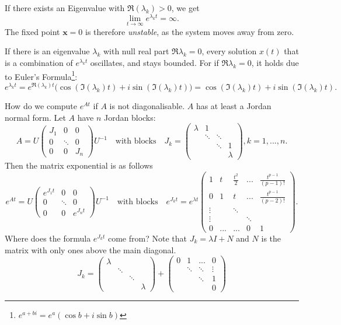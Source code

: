 \documentclass[hidelinks,a4paper, 11pt]{article}
\theoremstyle{plain}
\theoremstyle{break}
\theoremstyle{plain}
\theoremstyle{definition}
\begin{document}
If there exists an Eigenvalue with $\Re(\lambda_k) >0$, we get 
\[
	\lim_{t \to \infty}e^{\lambda_kt} = \infty.
\]
The fixed point $\mathbf x = 0$ is therefore  \emph{unstable}, as the system moves away from zero.

If there is an eigenvalue $\lambda_k$ with null real part $\Re \lambda_k =0$, every solution $x(t)$ that is a combination of $e^{\lambda_kt}$ oscillates, and stays bounded. For if $\Re \lambda_k =0$, it holds due to Euler's Formula\footnote{$e^{a+bi} = e^{a}(\cos b + i\sin b)$}:
\[
	e^{\lambda_k t} = e^{\Re(\lambda_k)t}\Big(\cos(\Im(\lambda_k)t) + i\sin(\Im(\lambda_k)t)\Big) = \cos(\Im(\lambda_k)t) + i\sin(\Im(\lambda_k)t).
\]

How do we compute $e^{At}$ if $A$ is not diagonalisable. $A$ has at least a Jordan normal form. Let $A$ have $n$ Jordan blocks:
\[
	A = U \begin{pmatrix}
		J_1 & 0 & 0 \\
		0   & \ddots & 0 \\
		0 & 0 & J_n
	\end{pmatrix} U^{-1} \quad \text{with blocks} \quad J_k = \begin{pmatrix}
		\lambda & 1 &  &  \\
		& \ddots & \ddots & \\
		&  & \ddots & 1 \\
		 & & & \lambda
	\end{pmatrix}, k=1,...,n.
\]
Then the matrix exponential is as follows
\[
	e^{At} = U \begin{pmatrix}
		e^{J_1t} & 0 & 0 \\
		0   & \ddots & 0 \\
		0 & 0 & e^{J_nt}
	\end{pmatrix}U^{-1} \quad \text{with blocks} \quad 
	e^{J_kt} = e^{\lambda t} \begin{pmatrix}
		1 & t & \frac{t^2}{2} & ... & \frac{t^{p-1}}{(p-1)!} \\
		0 & 1 & t                  & ... & \frac{t^{p-1}}{(p-2)!} \\
		\vdots & & \ddots \\
				\vdots & & & \ddots \\
		  0  & ...    &            ...        &   0  & 1
	\end{pmatrix}.
\]
Where does the formula $e^{J_kt}$ come from? Note that $J_k = \lambda I + N$ and $N$ is the matrix with only ones above the main diagonal. 
\[
	J_k = \begin{pmatrix}
	\lambda & &  & \\
	& \ddots & \\
	& & \ddots & \\
	& & & \lambda
	\end{pmatrix} + \begin{pmatrix}
	0 & 1 & ... & 0 \\
	& \ddots& \ddots & \vdots \\
	& & \ddots  & 1 \\
	  & & & 0
	\end{pmatrix}
\]
\end{document}
